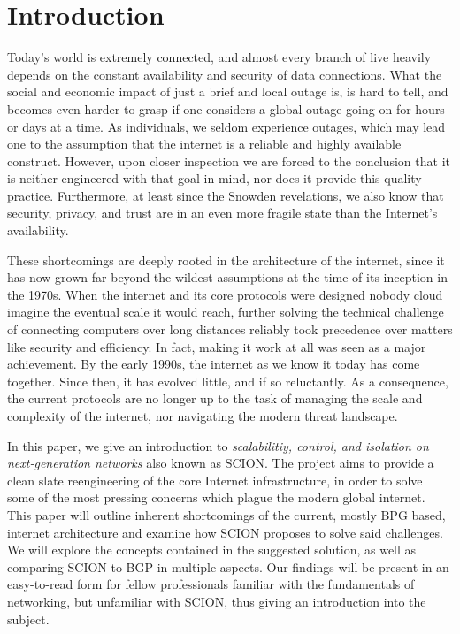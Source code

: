 \documentclass[../eva1_scion.tex]{subfiles}
\begin{document}
\section{Introduction}\label{sec:introduction}
\setcounter{page}{1}

Today's world is extremely connected, and almost every branch of live heavily depends on the constant availability and security of data connections. What the social and economic impact of just a brief and local outage is, is hard to tell, and becomes even harder to grasp if one considers a global outage going on for hours or days at a time. As individuals, we seldom experience outages, which may lead one to the assumption that the internet is a reliable and highly available construct. However, upon closer inspection we are forced to the conclusion that it is neither engineered with that goal in mind, nor does it provide this quality  practice. Furthermore, at least since the Snowden revelations, we also know that security, privacy, and trust are in an even more fragile state than the Internet's availability.

These shortcomings are deeply rooted in the architecture of the internet, since it has now grown far beyond the wildest assumptions at the time of its inception in the 1970s. When the internet and its core protocols were designed nobody cloud imagine the eventual scale it would reach, further solving the technical challenge of connecting computers over long distances reliably took precedence over matters like security and efficiency. In fact, making it work at all was seen as a major achievement. By the early 1990s, the internet as we know it today has come together. Since then, it has evolved little, and if so reluctantly. As a consequence, the current protocols are no longer up to the task of managing the scale and complexity of the internet, nor navigating the modern threat landscape.

In this paper, we give an introduction to \textit{scalabilitiy, control, and isolation on next-generation networks} also known as SCION. The project  aims to provide a clean slate reengineering of the core Internet infrastructure, in order to solve some of the most pressing concerns which plague the modern global internet. This paper will outline inherent shortcomings of the current, mostly BPG based, internet architecture and examine how SCION proposes to solve said challenges. We will explore the concepts contained in the suggested solution, as well as comparing SCION to  BGP in multiple aspects. Our findings will be present in an easy-to-read form for fellow professionals familiar with the fundamentals of networking, but unfamiliar with SCION, thus giving an introduction into the subject.
\end{document}
